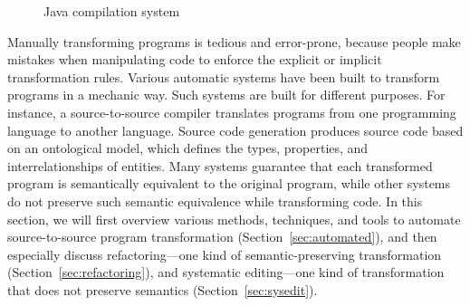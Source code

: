 \documentclass[runningheads,a4paper]{llncs}
\begin{document}
\begin{figure}
\centering
{}
\caption{Java compilation system}
\label{fig:javacompilation}
\end{figure}



Manually transforming programs is tedious and error-prone, because people make mistakes when manipulating code to enforce the explicit or implicit transformation rules.
Various automatic systems have been built to transform programs in a mechanic way. Such systems are built for different purposes. For instance, a source-to-source compiler translates programs from one programming language to another language. Source code generation produces source code based on an ontological model, which defines the types, properties, and interrelationships of entities. 
Many systems guarantee that each transformed program is semantically equivalent to the original program, while other systems do not preserve such semantic equivalence while transforming code. In this section, we will first overview various methods, techniques, and tools to automate source-to-source program transformation (Section~\ref{sec:automated}), and then especially discuss refactoring---one kind of semantic-preserving transformation (Section~\ref{sec:refactoring}), and systematic editing---one kind of transformation that does not preserve semantics (Section~\ref{sec:sysedit}).
\end{document}
